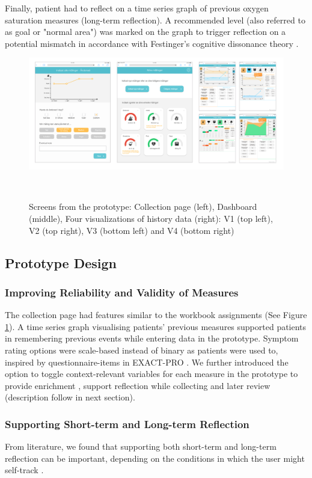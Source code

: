 Finally, patient had to reflect on a time series graph of previous oxygen saturation measures (long-term reflection). A recommended level (also referred to as goal or "normal area") was marked on the graph to trigger reflection on a potential mismatch in accordance with Festinger's cognitive dissonance theory \cite{Rivera}.

\begin{figure}
 \centering
 \includegraphics[width=2.1\columnwidth]{img/screens}
 \caption{Screens from the prototype: Collection page (left), Dashboard (middle), Four visualizations of history data (right): V1 (top left), V2 (top right), V3 (bottom left) and V4 (bottom right)}~\label{fig:design}
\end{figure}

\subsection{Prototype Design}
\subsubsection{Improving Reliability and Validity of Measures}
The collection page had features similar to the workbook assignments (See Figure \ref{fig:design}). A time series graph visualising patients' previous measures supported patients in remembering previous events while entering data in the prototype. Symptom rating options were scale-based instead of binary as patients were used to, inspired by questionnaire-items in EXACT-PRO \cite{exact}. We further introduced the option to toggle context-relevant variables for each measure in the prototype to provide enrichment \cite{Rivera}, support reflection while collecting and later review (description follow in next section).

\subsubsection{Supporting Short-term and Long-term Reflection}
From literature, we found that supporting both short-term and long-term reflection can be important, depending on the conditions in which the user might self-track \cite{Li2010, Muller}.

